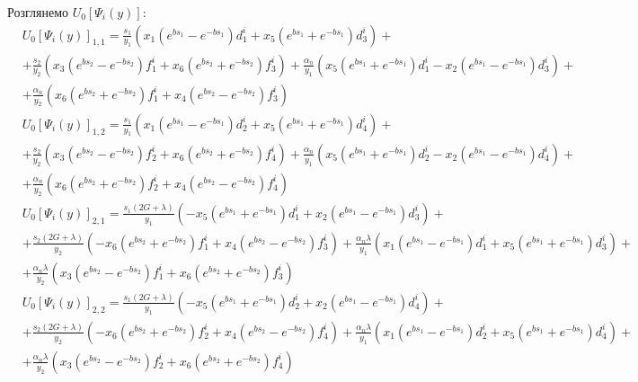 Розглянемо $U_0\left[ \Psi_i(y) \right]$:
\begin{align*}
    &U_0\left[ \Psi_i(y) \right]_{1,1} = \frac{s_1}{y_1} \left(x_1(e^{b s_1} - e^{-b s_1})d_1^i + x_5(e^{b s_1} + e^{-b s_1})d_3^i \right) + \\
    &+ \frac{s_2}{y_2} \left( x_3(e^{b s_2} - e^{-b s_2})f_1^i + x_6(e^{b s_2} + e^{-b s_2})f_3^i \right) 
    + \frac{\alpha_n}{y_1} \left( x_5(e^{b s_1} + e^{-b s_1})d_1^i - x_2(e^{b s_1} - e^{-b s_1})d_3^i \right) + \\
    & + \frac{\alpha_n}{y_2} \left( x_6(e^{b s_2} + e^{-b s_2})f_1^i + x_4(e^{b s_2} - e^{-b s_2})f_3^i \right)
\end{align*}
\begin{align*}
    &U_0\left[ \Psi_i(y) \right]_{1,2} = \frac{s_1}{y_1} \left(x_1(e^{b s_1} - e^{-b s_1})d_2^i + x_5(e^{b s_1} + e^{-b s_1})d_4^i \right) + \\
    &+ \frac{s_2}{y_2} \left( x_3(e^{b s_2} - e^{-b s_2})f_2^i + x_6(e^{b s_2} + e^{-b s_2})f_4^i \right) 
    + \frac{\alpha_n}{y_1} \left( x_5(e^{b s_1} + e^{-b s_1})d_2^i - x_2(e^{b s_1} - e^{-b s_1})d_4^i \right) + \\
    & + \frac{\alpha_n}{y_2} \left( x_6(e^{b s_2} + e^{-b s_2})f_2^i + x_4(e^{b s_2} - e^{-b s_2})f_4^i \right)
\end{align*}
\begin{align*}
    &U_0\left[ \Psi_i(y) \right]_{2,1} = \frac{s_1 (2G + \lambda)}{y_1} \left( -x_5(e^{b s_1} + e^{-b s_1})d_1^i + x_2(e^{b s_1} - e^{-b s_1})d_3^i \right) + \\
    &+ \frac{s_2 (2G + \lambda)}{y_2} \left( -x_6(e^{b s_2} + e^{-b s_2})f_1^i + x_4(e^{b s_2} - e^{-b s_2})f_3^i \right) 
    + \frac{\alpha_n\lambda}{y_1} \left( x_1(e^{b s_1} - e^{-b s_1})d_1^i + x_5(e^{b s_1} + e^{-b s_1})d_3^i \right) + \\
    & + \frac{\alpha_n\lambda}{y_2} \left( x_3(e^{b s_2} - e^{-b s_2})f_1^i + x_6(e^{b s_2} + e^{-b s_2})f_3^i \right)
\end{align*}
\begin{align*}
    &U_0\left[ \Psi_i(y) \right]_{2,2} = \frac{s_1 (2G + \lambda)}{y_1} \left( -x_5(e^{b s_1} + e^{-b s_1})d_2^i + x_2(e^{b s_1} - e^{-b s_1})d_4^i \right) + \\
    &+ \frac{s_2 (2G + \lambda)}{y_2} \left( -x_6(e^{b s_2} + e^{-b s_2})f_2^i + x_4(e^{b s_2} - e^{-b s_2})f_4^i \right) 
    + \frac{\alpha_n\lambda}{y_1} \left( x_1(e^{b s_1} - e^{-b s_1})d_2^i + x_5(e^{b s_1} + e^{-b s_1})d_4^i \right) + \\
    & + \frac{\alpha_n\lambda}{y_2} \left( x_3(e^{b s_2} - e^{-b s_2})f_2^i + x_6(e^{b s_2} + e^{-b s_2})f_4^i \right)
\end{align*}


